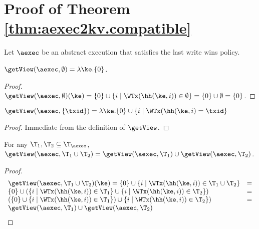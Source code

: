 \section{Proof of Theorem \ref{thm:aexec2kv.compatible}}

Let $\aexec$ be an abstract execution that satisfies the last write wins 
policy.

\begin{lemma}
$\getView(\aexec, \emptyset) = \lambda \ke.\{0\}$.
\end{lemma}

\begin{proof}
$\getView(\aexec, \emptyset)(\ke) = \{0\} \cup \{ i \mid 
\WTx(\hh(\ke, i)) \in \emptyset\} = \{0\} \cup \emptyset = \{0\}$.
\end{proof}
%
%
\begin{lemma}
$\getView(\aexec, \{\txid\}) = \lambda \ke. \{0\} \cup \{i \mid 
\WTx(\hh(\ke, i) = \txid\}$
\end{lemma}

\begin{proof}
Immediate from the definition of $\getView$.
\end{proof}

\begin{lemma}
For any $\T_1, \T_2 \subseteq \T_{\aexec}$, $\getView(\aexec, \T_1 \cup \T_2) = 
\getView(\aexec, \T_1) \cup \getView(\aexec, \T_2)$.
\end{lemma}

\begin{proof}
\[
\begin{array}{lr}
\getView(\aexec, \T_1 \cup \T_2)(\ke) = \{ 0 \} \cup \{ i \mid \WTx(\hh(\ke, i)) \in \T_1 \cup \T_2\} &=\\
\{0\} \cup (\{i \mid \WTx(\hh(\ke, i)) \in \T_1\} \cup \{i \mid \WTx(\hh(\ke, i)) \in \T_2\}) &= \\
(\{0\} \cup \{i \mid \WTx(\hh(\ke,i)) \in \T_1\}) \cup \{i \mid \WTx(\hh(\ke, i)) \in \T_2\}) &= \\
\getView(\aexec, \T_1) \cup \getView(\aexec, \T_2)
\end{array}
\]
\end{proof}